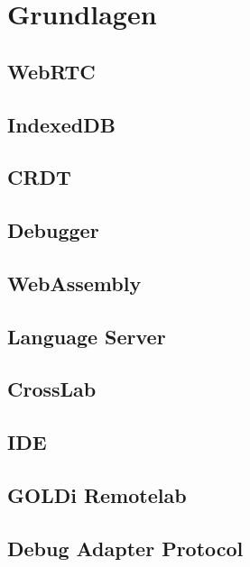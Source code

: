 \chapter{Grundlagen} \label{grundlagen}

\section{WebRTC}


\section{IndexedDB}


\section{CRDT}


\section{Debugger}


\section{WebAssembly}


\section{Language Server}


\section{CrossLab}


\section{IDE}


\section{GOLDi Remotelab}


\section{Debug Adapter Protocol}